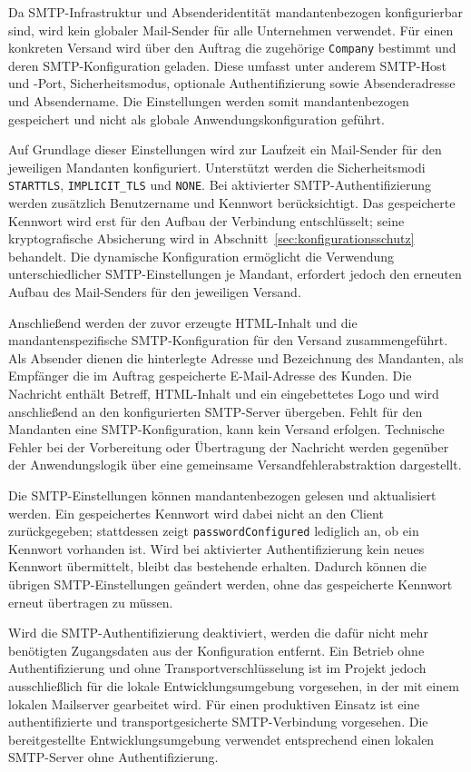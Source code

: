 Da SMTP-Infrastruktur und Absenderidentität mandantenbezogen konfigurierbar
sind, wird kein globaler Mail-Sender für alle Unternehmen verwendet. Für einen
konkreten Versand wird über den Auftrag die zugehörige \texttt{Company}
bestimmt und deren SMTP-Konfiguration geladen. Diese umfasst unter anderem
SMTP-Host und -Port, Sicherheitsmodus, optionale Authentifizierung sowie
Absenderadresse und Absendername. Die Einstellungen werden somit
mandantenbezogen gespeichert und nicht als globale Anwendungskonfiguration
geführt.

Auf Grundlage dieser Einstellungen wird zur Laufzeit ein Mail-Sender für den
jeweiligen Mandanten konfiguriert. Unterstützt werden die Sicherheitsmodi
\texttt{STARTTLS}, \texttt{IMPLICIT\_TLS} und \texttt{NONE}. Bei aktivierter
SMTP-Authentifizierung werden zusätzlich Benutzername und Kennwort
berücksichtigt. Das gespeicherte Kennwort wird erst für den Aufbau der
Verbindung entschlüsselt; seine kryptografische Absicherung wird in
Abschnitt~\ref{sec:konfigurationsschutz} behandelt. Die dynamische
Konfiguration ermöglicht die Verwendung unterschiedlicher SMTP-Einstellungen
je Mandant, erfordert jedoch den erneuten Aufbau des Mail-Senders für den
jeweiligen Versand.

Anschließend werden der zuvor erzeugte HTML-Inhalt und die
mandantenspezifische SMTP-Konfiguration für den Versand zusammengeführt. Als
Absender dienen die hinterlegte Adresse und Bezeichnung des Mandanten, als
Empfänger die im Auftrag gespeicherte E-Mail-Adresse des Kunden. Die Nachricht
enthält Betreff, HTML-Inhalt und ein eingebettetes Logo und wird anschließend
an den konfigurierten SMTP-Server übergeben. Fehlt für den Mandanten eine
SMTP-Konfiguration, kann kein Versand erfolgen. Technische Fehler bei der
Vorbereitung oder Übertragung der Nachricht werden gegenüber der
Anwendungslogik über eine gemeinsame Versandfehlerabstraktion dargestellt.

Die SMTP-Einstellungen können mandantenbezogen gelesen und aktualisiert werden.
Ein gespeichertes Kennwort wird dabei nicht an den Client zurückgegeben;
stattdessen zeigt \texttt{passwordConfigured} lediglich an, ob ein Kennwort
vorhanden ist. Wird bei aktivierter Authentifizierung kein neues Kennwort
übermittelt, bleibt das bestehende erhalten. Dadurch können die übrigen
SMTP-Einstellungen geändert werden, ohne das gespeicherte Kennwort erneut
übertragen zu müssen.

Wird die SMTP-Authentifizierung deaktiviert, werden die dafür nicht mehr
benötigten Zugangsdaten aus der Konfiguration entfernt. Ein Betrieb ohne
Authentifizierung und ohne Transportverschlüsselung ist im Projekt jedoch
ausschließlich für die lokale Entwicklungsumgebung vorgesehen, in der mit
einem lokalen Mailserver gearbeitet wird. Für einen produktiven Einsatz ist
eine authentifizierte und transportgesicherte SMTP-Verbindung vorgesehen. Die
bereitgestellte Entwicklungsumgebung verwendet entsprechend einen lokalen
SMTP-Server ohne Authentifizierung.

